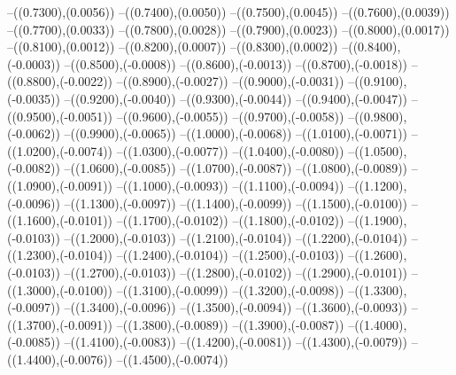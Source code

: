 {	--({\sx*(0.7300)},{\sy*(0.0056)})
	--({\sx*(0.7400)},{\sy*(0.0050)})
	--({\sx*(0.7500)},{\sy*(0.0045)})
	--({\sx*(0.7600)},{\sy*(0.0039)})
	--({\sx*(0.7700)},{\sy*(0.0033)})
	--({\sx*(0.7800)},{\sy*(0.0028)})
	--({\sx*(0.7900)},{\sy*(0.0023)})
	--({\sx*(0.8000)},{\sy*(0.0017)})
	--({\sx*(0.8100)},{\sy*(0.0012)})
	--({\sx*(0.8200)},{\sy*(0.0007)})
	--({\sx*(0.8300)},{\sy*(0.0002)})
	--({\sx*(0.8400)},{\sy*(-0.0003)})
	--({\sx*(0.8500)},{\sy*(-0.0008)})
	--({\sx*(0.8600)},{\sy*(-0.0013)})
	--({\sx*(0.8700)},{\sy*(-0.0018)})
	--({\sx*(0.8800)},{\sy*(-0.0022)})
	--({\sx*(0.8900)},{\sy*(-0.0027)})
	--({\sx*(0.9000)},{\sy*(-0.0031)})
	--({\sx*(0.9100)},{\sy*(-0.0035)})
	--({\sx*(0.9200)},{\sy*(-0.0040)})
	--({\sx*(0.9300)},{\sy*(-0.0044)})
	--({\sx*(0.9400)},{\sy*(-0.0047)})
	--({\sx*(0.9500)},{\sy*(-0.0051)})
	--({\sx*(0.9600)},{\sy*(-0.0055)})
	--({\sx*(0.9700)},{\sy*(-0.0058)})
	--({\sx*(0.9800)},{\sy*(-0.0062)})
	--({\sx*(0.9900)},{\sy*(-0.0065)})
	--({\sx*(1.0000)},{\sy*(-0.0068)})
	--({\sx*(1.0100)},{\sy*(-0.0071)})
	--({\sx*(1.0200)},{\sy*(-0.0074)})
	--({\sx*(1.0300)},{\sy*(-0.0077)})
	--({\sx*(1.0400)},{\sy*(-0.0080)})
	--({\sx*(1.0500)},{\sy*(-0.0082)})
	--({\sx*(1.0600)},{\sy*(-0.0085)})
	--({\sx*(1.0700)},{\sy*(-0.0087)})
	--({\sx*(1.0800)},{\sy*(-0.0089)})
	--({\sx*(1.0900)},{\sy*(-0.0091)})
	--({\sx*(1.1000)},{\sy*(-0.0093)})
	--({\sx*(1.1100)},{\sy*(-0.0094)})
	--({\sx*(1.1200)},{\sy*(-0.0096)})
	--({\sx*(1.1300)},{\sy*(-0.0097)})
	--({\sx*(1.1400)},{\sy*(-0.0099)})
	--({\sx*(1.1500)},{\sy*(-0.0100)})
	--({\sx*(1.1600)},{\sy*(-0.0101)})
	--({\sx*(1.1700)},{\sy*(-0.0102)})
	--({\sx*(1.1800)},{\sy*(-0.0102)})
	--({\sx*(1.1900)},{\sy*(-0.0103)})
	--({\sx*(1.2000)},{\sy*(-0.0103)})
	--({\sx*(1.2100)},{\sy*(-0.0104)})
	--({\sx*(1.2200)},{\sy*(-0.0104)})
	--({\sx*(1.2300)},{\sy*(-0.0104)})
	--({\sx*(1.2400)},{\sy*(-0.0104)})
	--({\sx*(1.2500)},{\sy*(-0.0103)})
	--({\sx*(1.2600)},{\sy*(-0.0103)})
	--({\sx*(1.2700)},{\sy*(-0.0103)})
	--({\sx*(1.2800)},{\sy*(-0.0102)})
	--({\sx*(1.2900)},{\sy*(-0.0101)})
	--({\sx*(1.3000)},{\sy*(-0.0100)})
	--({\sx*(1.3100)},{\sy*(-0.0099)})
	--({\sx*(1.3200)},{\sy*(-0.0098)})
	--({\sx*(1.3300)},{\sy*(-0.0097)})
	--({\sx*(1.3400)},{\sy*(-0.0096)})
	--({\sx*(1.3500)},{\sy*(-0.0094)})
	--({\sx*(1.3600)},{\sy*(-0.0093)})
	--({\sx*(1.3700)},{\sy*(-0.0091)})
	--({\sx*(1.3800)},{\sy*(-0.0089)})
	--({\sx*(1.3900)},{\sy*(-0.0087)})
	--({\sx*(1.4000)},{\sy*(-0.0085)})
	--({\sx*(1.4100)},{\sy*(-0.0083)})
	--({\sx*(1.4200)},{\sy*(-0.0081)})
	--({\sx*(1.4300)},{\sy*(-0.0079)})
	--({\sx*(1.4400)},{\sy*(-0.0076)})
	--({\sx*(1.4500)},{\sy*(-0.0074)})
}
